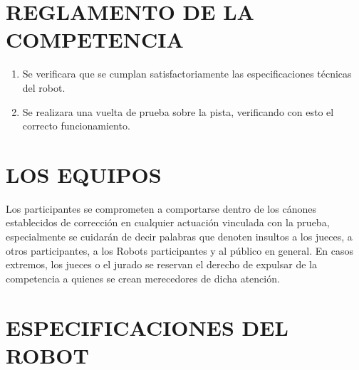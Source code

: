 \documentclass{article}
\begin{document}
\section{REGLAMENTO DE LA COMPETENCIA}

\begin{enumerate}
\item Se verificara que se cumplan satisfactoriamente las especificaciones técnicas
del robot.
\item Se realizara una vuelta de prueba sobre la pista, verificando con esto el
correcto funcionamiento.
\end{enumerate}



\section{LOS EQUIPOS}

Los participantes se comprometen a comportarse dentro de los cánones
establecidos de corrección en cualquier actuación vinculada con la prueba,
especialmente se cuidarán de decir palabras que denoten insultos a los
jueces, a otros participantes, a los Robots participantes y al público en general.
En casos extremos, los jueces o el jurado se reservan el derecho de expulsar
de la competencia a quienes se crean merecedores de dicha atención.

\section{ESPECIFICACIONES DEL ROBOT}
\end{document}
